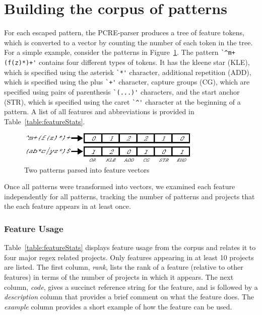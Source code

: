 \section{Building the corpus of patterns}
\label{sec:corpus}
For each escaped pattern, the PCRE-parser produces a tree of feature tokens, which is converted to a vector by counting the number of each token  in the tree.  For a simple example, consider the patterns in Figure~\ref{fig:featureParsing}.  The pattern \verb!`^m+(f(z)*)+'! contains four different types of tokens. It has the kleene star (KLE), which is specified using the asterisk \verb!`*'! character, additional repetition (ADD), which is specified using the plus \verb!`+'! character, capture groups (CG), which are specified using pairs of parenthesis \verb!`(...)'! characters, and the start anchor (STR), which is specified using the caret \verb!`^'! character at the beginning of a pattern. A list of all features and abbreviations is provided in Table~\ref{table:featureStats}.

\begin{figure}[tb]
\centering
\includegraphics[height=0.6in]{nontex/illustrations/featureParsing.eps}
\caption{Two patterns parsed into feature vectors}
\label{fig:featureParsing}
\vspace{-12pt}
\end{figure}

Once all patterns were transformed into vectors, we examined each feature independently for all patterns, tracking the number of patterns and  projects that the each feature appears in at least once.



\subsubsection{Feature Usage}
Table~\ref{table:featureStats} displays feature usage from the corpus and relates it to four major regex related projects. Only features appearing in at least 10 projects are listed.
The first column, \emph{rank}, lists the rank of a feature (relative to other features) in terms of the number of projects in which it appears. The next column, \emph{code}, gives a succinct reference string for the feature, and is followed by a \emph{description} column that provides a brief comment on what the feature does.  The \emph{example} column provides a short example of how the feature can be used.


